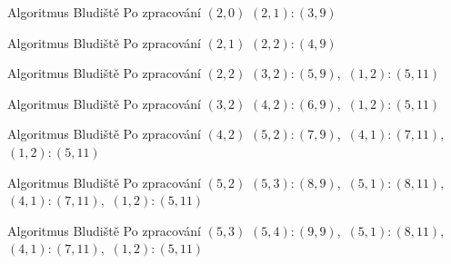 \documentclass[11pt,professionalfont,aspectratio=43]{beamer}
\begin{document}
    \begin{frame}{Algoritmus \Astar}{Bludiště}
    \centering
    \AStarMazeState
        {Po zpracování $(2,0)$}
        {$(2,1):(3,9)$}
        {\AStarMazeTreeD}
        {\AStarMazeNodesD}
    \end{frame}

    \begin{frame}{Algoritmus \Astar}{Bludiště}
    \centering
    \AStarMazeState
        {Po zpracování $(2,1)$}
        {$(2,2):(4,9)$}
        {\AStarMazeTreeE}
        {\AStarMazeNodesE}
    \end{frame}

    \begin{frame}{Algoritmus \Astar}{Bludiště}
    \centering
    \AStarMazeState
        {Po zpracování $(2,2)$}
        {$(3,2):(5,9)$,\ $(1,2):(5,11)$}
        {\AStarMazeTreeF}
        {\AStarMazeNodesF}
    \end{frame}

    \begin{frame}{Algoritmus \Astar}{Bludiště}
    \centering
    \AStarMazeState
        {Po zpracování $(3,2)$}
        {$(4,2):(6,9)$,\ $(1,2):(5,11)$}
        {\AStarMazeTreeG}
        {\AStarMazeNodesG}
    \end{frame}

    \begin{frame}{Algoritmus \Astar}{Bludiště}
    \centering
    \AStarMazeState
        {Po zpracování $(4,2)$}
        {$(5,2):(7,9)$,\ $(4,1):(7,11)$,\\[0.5mm]
        $(1,2):(5,11)$}
        {\AStarMazeTreeH}
        {\AStarMazeNodesH}
    \end{frame}

    \begin{frame}{Algoritmus \Astar}{Bludiště}
    \centering
    \AStarMazeState
        {Po zpracování $(5,2)$}
        {$(5,3):(8,9)$,\ $(5,1):(8,11)$,\\[0.5mm]
        $(4,1):(7,11)$,\ $(1,2):(5,11)$}
        {\AStarMazeTreeI}
        {\AStarMazeNodesI}
    \end{frame}

    \begin{frame}{Algoritmus \Astar}{Bludiště}
    \centering
    \AStarMazeState
        {Po zpracování $(5,3)$}
        {$(5,4):(9,9)$,\ $(5,1):(8,11)$,\\[0.5mm]
        $(4,1):(7,11)$,\ $(1,2):(5,11)$}
        {\AStarMazeTreeJ}
        {\AStarMazeNodesJ}
    \end{frame}
\end{document}
